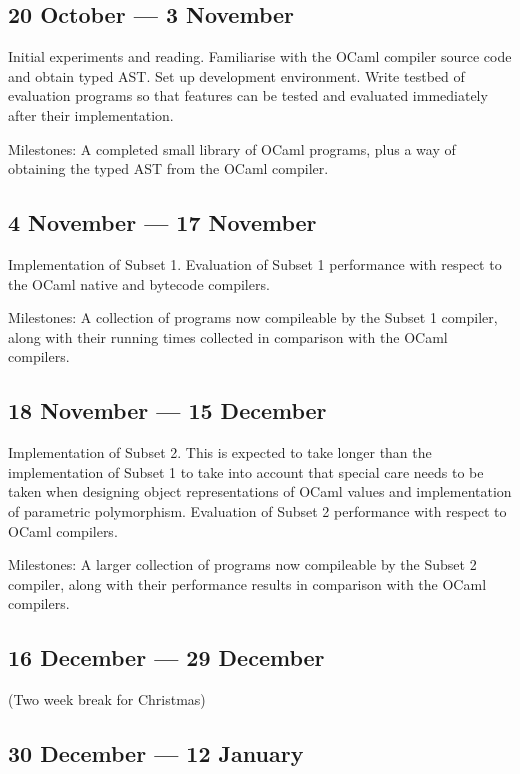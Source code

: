 \subsection*{20 October --- 3 November}

Initial experiments and reading. Familiarise with the OCaml compiler source
code and obtain typed AST\@. Set up development environment. Write testbed of
evaluation programs so that features can be tested and evaluated immediately
after their implementation.

Milestones: A completed small library of OCaml programs, plus a way of
obtaining the typed AST from the OCaml compiler.

\subsection*{4 November --- 17 November}

Implementation of Subset 1. Evaluation of Subset 1 performance with respect to
the OCaml native and bytecode compilers.

Milestones: A collection of programs now compileable by the Subset 1 compiler,
along with their running times collected in comparison with the OCaml
compilers.

\subsection*{18 November --- 15 December}

Implementation of Subset 2. This is expected to take longer than the
implementation of Subset 1 to take into account that special care needs to be
taken when designing object representations of OCaml values and implementation
of parametric polymorphism. Evaluation of Subset 2 performance with respect to
OCaml compilers.

Milestones: A larger collection of programs now compileable by the Subset 2
compiler, along with their performance results in comparison with the OCaml
compilers.

\subsection*{16 December --- 29 December}

(Two week break for Christmas)

\subsection*{30 December --- 12 January}

